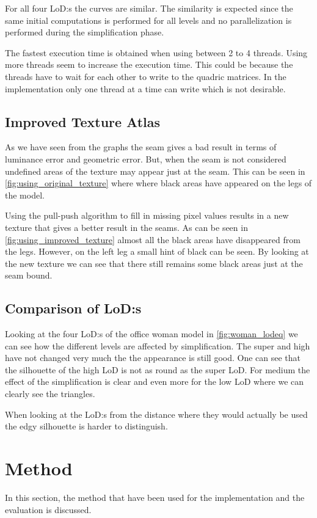 For all four LoD:s the curves are similar. The similarity is expected since the same initial computations is performed for all levels and no parallelization is performed during the simplification phase.

The fastest execution time is obtained when using between 2 to 4 threads. Using more threads seem to increase the execution time. This could be because the threads have to wait for each other to write to the quadric matrices. In the implementation only one thread at a time can write which is not desirable.


\subsection{Improved Texture Atlas} \label{sec:discussion_texture}
As we have seen from the graphs the seam gives a bad result in terms of luminance error and geometric error. But, when the seam is not considered undefined areas of the texture may appear just at the seam. This can be seen in \cref{fig:using_original_texture} where where black areas have appeared on the legs of the model.

Using the pull-push algorithm to fill in missing pixel values results in a new texture that gives a better result in the seams. As can be seen in \cref{fig:using_improved_texture} almost all the black areas have disappeared from the legs. However, on the left leg a small hint of black can be seen. By looking at the new texture we can see that there still remains some black areas just at the seam bound.


\subsection{Comparison of LoD:s} \label{sec:discussion_lod}
Looking at the four LoD:s of the office woman model in \cref{fig:woman_lodeq} we can see how the different levels are affected by simplification. The super and high have not changed very much the the appearance is still good. One can see that the silhouette of the high LoD is not as round as the super LoD. For medium the effect of the simplification is clear and even more for the low LoD where we can clearly see the triangles.

When looking at the LoD:s from the distance where they would actually be used the edgy silhouette is harder to distinguish. 

\clearpage

\section{Method} \label{sec:discussion_method}
In this section, the method that have been used for the implementation and the evaluation is discussed.

